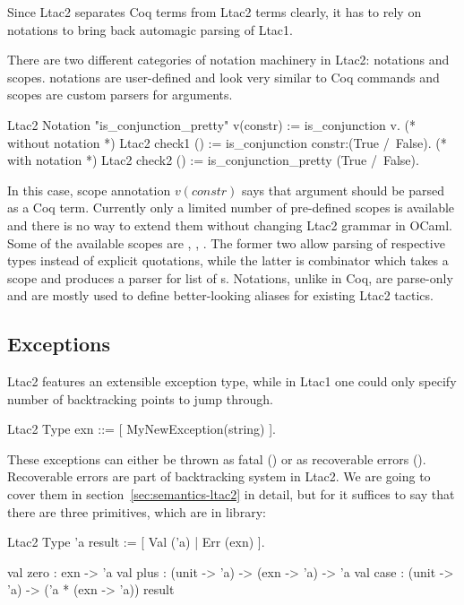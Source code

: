 Since Ltac2 separates Coq terms from Ltac2 terms clearly, it has to rely on notations to bring back automagic parsing of Ltac1.

There are two different categories of notation machinery in Ltac2: notations and scopes.
notations are user-defined and look very similar to Coq  commands and scopes are custom parsers for arguments.
\begin{coq}
Ltac2 Notation "is_conjunction_pretty" v(constr) := is_conjunction v.
(* without notation *)
Ltac2 check1 () := is_conjunction constr:(True /\ False).
(* with notation *)
Ltac2 check2 () := is_conjunction_pretty (True /\ False).
\end{coq}

In this case, scope annotation \(v(constr)\) says that argument  should be parsed as a Coq term.
Currently only a limited number of pre-defined scopes is available and there is no way to extend them without changing Ltac2 grammar in OCaml.
Some of the available scopes are , , .
The former two allow parsing of respective types instead of explicit quotations, while the latter is combinator which takes a scope  and produces a parser for list of s.
Notations, unlike in Coq, are parse-only and are mostly used to define better-looking aliases for existing Ltac2 tactics.

\subsection{Exceptions}
\label{subsec:ltac2-exceptions}

Ltac2 features an extensible exception type, while in Ltac1 one could only specify number of backtracking points to jump through.
\begin{coq}
Ltac2 Type exn ::= [ MyNewException(string) ].
\end{coq}

These exceptions can either be thrown as fatal () or as recoverable errors ().
Recoverable errors are part of backtracking system in Ltac2.
We are going to cover them in section~\ref{sec:semantics-ltac2} in detail, but for it suffices to say that there are three primitives, which are in  library:

\begin{coq}
Ltac2 Type 'a result := [ Val ('a) | Err (exn) ].

val zero : exn -> 'a
val plus : (unit -> 'a) -> (exn -> 'a) -> 'a
val case : (unit -> 'a) -> ('a * (exn -> 'a)) result
\end{coq}

